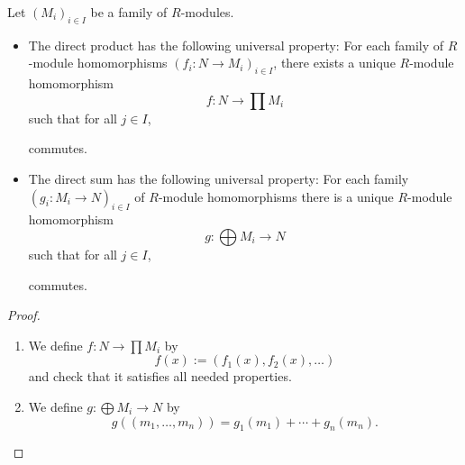 \begin{theorem}
    Let $(M_i)_{i \in I}$ be a family of $R$-modules.
    \begin{itemize}
    \item The direct product has the following universal property: For each family of $R$-module homomorphisms $(f_i: N \to M_i)_{i \in I}$, there exists a unique $R$-module homomorphism \[
        f: N \to \prod M_i
        \]  such that for all $j \in I$,
        \begin{figure}[H]
           \centering 
        \end{figure}
        commutes.
    \item The direct sum has the following universal property: For each family $(g_i: M_i \to N)_{i \in I}$ of $R$-module homomorphisms there is a unique $R$-module homomorphism \[
    g: \bigoplus M_i \to N
    \] such that for all $j \in I$,
    \begin{figure}[H]
        \centering
    \end{figure}
    commutes.
    \end{itemize}
\end{theorem}
\begin{proof}
   \begin{enumerate}
       \item We define $f: N \to \prod M_i$ by \[
       f(x):=(f_1(x),f_2(x),\dots)
       \] and check that it satisfies all needed properties.
        \begin{figure}[H]
           \centering 
        \end{figure}
   \item We define $g: \bigoplus M_i \to N$ by \[
g((m_1, \dots, m_n))=g_1(m_1)+\cdots+g_n(m_n)
   .\] 
   \end{enumerate} 
\end{proof} 

